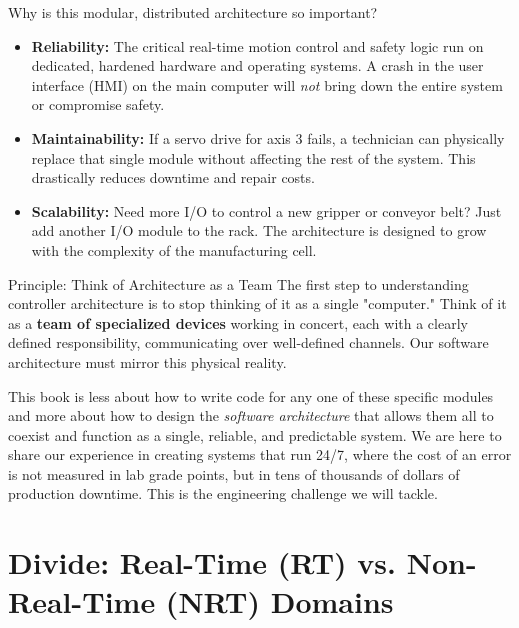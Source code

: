 Why is this modular, distributed architecture so important?
\begin{itemize}
    \item \textbf{Reliability:} The critical real-time motion control and safety logic run on dedicated, hardened hardware and operating systems. A crash in the user interface (HMI) on the main computer will \textit{not} bring down the entire system or compromise safety.
    \item \textbf{Maintainability:} If a servo drive for axis 3 fails, a technician can physically replace that single module without affecting the rest of the system. This drastically reduces downtime and repair costs.
    \item \textbf{Scalability:} Need more I/O to control a new gripper or conveyor belt? Just add another I/O module to the rack. The architecture is designed to grow with the complexity of the manufacturing cell.
\end{itemize}

\begin{principlebox}{Principle: Think of Architecture as a Team}
The first step to understanding controller architecture is to stop thinking of it as a single "computer." Think of it as a \textbf{team of specialized devices} working in concert, each with a clearly defined responsibility, communicating over well-defined channels. Our software architecture must mirror this physical reality.
\end{principlebox}

This book is less about how to write code for any one of these specific modules and more about how to design the \textit{software architecture} that allows them all to coexist and function as a single, reliable, and predictable system. We are here to share our experience in creating systems that run 24/7, where the cost of an error is not measured in lab grade points, but in tens of thousands of dollars of production downtime. This is the engineering challenge we will tackle.


\section{Divide: Real-Time (RT) vs. Non-Real-Time (NRT) Domains}
\label{sec:rt_nrt_divide}

